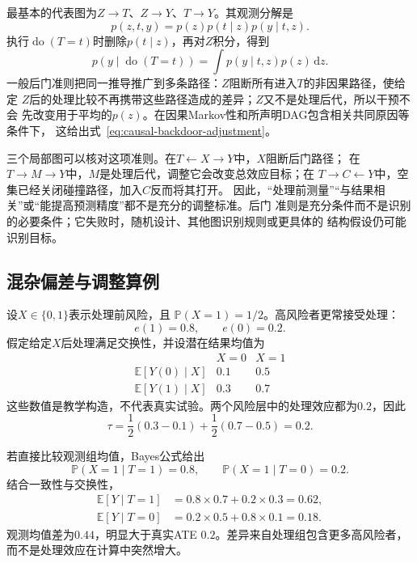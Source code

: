 最基本的代表图为\(Z\to T\)、\(Z\to Y\)、\(T\to Y\)。其观测分解是
\[
  p(z,t,y)=p(z)p(t\mid z)p(y\mid t,z).
\]
执行\(\operatorname{do}(T=t)\)时删除\(p(t\mid z)\)，再对\(Z\)积分，得到
\begin{equation}
  p(y\mid\operatorname{do}(T=t))
  =
  \int p(y\mid t,z)p(z)\,\mathrm{d}z.
  \label{eq:causal-backdoor-adjustment}
\end{equation}
一般后门准则把同一推导推广到多条路径：\(Z\)阻断所有进入\(T\)的非因果路径，使给定
\(Z\)后的处理比较不再携带这些路径造成的差异；\(Z\)又不是处理后代，所以干预不会
先改变用于平均的\(p(z)\)。在因果Markov性和所声明DAG包含相关共同原因等条件下，
这给出式~\eqref{eq:causal-backdoor-adjustment}。

三个局部图可以核对这项准则。在\(T\leftarrow X\to Y\)中，\(X\)阻断后门路径；
在\(T\to M\to Y\)中，\(M\)是处理后代，调整它会改变总效应目标；在
\(T\to C\leftarrow Y\)中，空集已经关闭碰撞路径，加入\(C\)反而将其打开。
因此，“处理前测量”“与结果相关”或“能提高预测精度”都不是充分的调整标准。后门
准则是充分条件而不是识别的必要条件；它失败时，随机设计、其他图识别规则或更具体的
结构假设仍可能识别目标。

\subsection{混杂偏差与调整算例}

设\(X\in\{0,1\}\)表示处理前风险，且
\(\mathbb{P}(X=1)=1/2\)。高风险者更常接受处理：
\[
  e(1)=0.8,\qquad e(0)=0.2.
\]
假定给定\(X\)后处理满足交换性，并设潜在结果均值为
\[
\begin{array}{c|cc}
  &X=0&X=1\\ \hline
  \mathbb{E}[Y(0)\mid X]&0.1&0.5\\
  \mathbb{E}[Y(1)\mid X]&0.3&0.7
\end{array}
\]
这些数值是教学构造，不代表真实试验。两个风险层中的处理效应都为\(0.2\)，因此
\[
  \tau
  =
  \frac12(0.3-0.1)+\frac12(0.7-0.5)
  =0.2.
\]

若直接比较观测组均值，Bayes公式给出
\[
  \mathbb{P}(X=1\mid T=1)=0.8,\qquad
  \mathbb{P}(X=1\mid T=0)=0.2.
\]
结合一致性与交换性，
\[
\begin{aligned}
  \mathbb{E}[Y\mid T=1]
  &=0.8\times0.7+0.2\times0.3=0.62,\\
  \mathbb{E}[Y\mid T=0]
  &=0.2\times0.5+0.8\times0.1=0.18.
\end{aligned}
\]
观测均值差为\(0.44\)，明显大于真实ATE \(0.2\)。差异来自处理组包含更多高风险者，
而不是处理效应在计算中突然增大。

